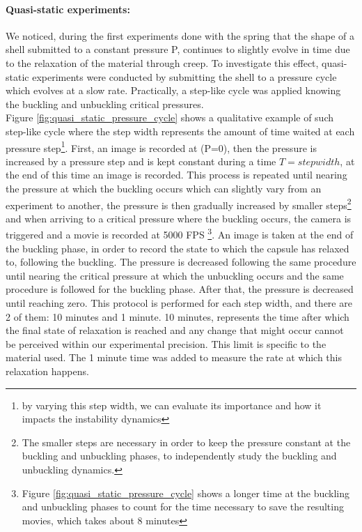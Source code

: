 \paragraph{Quasi-static experiments:}
We noticed, during the first experiments done with the spring that the shape of a shell submitted to a constant pressure P, continues to slightly evolve in time due to the relaxation of the material through creep. To investigate this effect, quasi-static experiments were conducted by submitting the shell to a pressure cycle which evolves at a slow rate. Practically, a step-like cycle was applied knowing the buckling and unbuckling critical pressures.\\
Figure \ref{fig:quasi_static_pressure_cycle} shows a qualitative example of such step-like cycle where the step width represents the amount of time waited at each pressure step\footnote{by varying this step width, we can evaluate its importance and how it impacts the instability dynamics}.
First, an image is recorded at (P=0), then the pressure is increased by a pressure step and is kept constant during a time $T=step width$, at the end of this time an image is recorded. This process is repeated until nearing the pressure at which the buckling occurs which can slightly vary from an experiment to another, the pressure is then gradually increased by smaller steps\footnote{The smaller steps are necessary in order to keep the pressure constant at the buckling and unbuckling phases, to independently study the buckling and unbuckling dynamics.}
 and when arriving to a critical pressure where the buckling occurs, the camera is triggered and a movie is recorded at 5000 FPS \footnote{Figure \ref{fig:quasi_static_pressure_cycle} shows a longer time at the buckling and unbuckling phases to count for the time necessary to save the resulting movies, which takes about 8 minutes}. An image is taken at the end of the buckling phase, in order to record the state to which the capsule has relaxed to, following the buckling.
The pressure is decreased following the same procedure until nearing the critical pressure at which the unbuckling occurs and the same procedure is followed for the buckling phase. After that, the pressure is decreased until reaching zero.
This protocol is performed for each step width, and there are 2 of them: 10 minutes and 1 minute. 10 minutes, represents the time after which the final state of relaxation is reached and any change that might occur cannot be perceived within our experimental precision. This limit is specific to the material used. The 1 minute time was added to measure the rate at which this relaxation happens.\\
   
